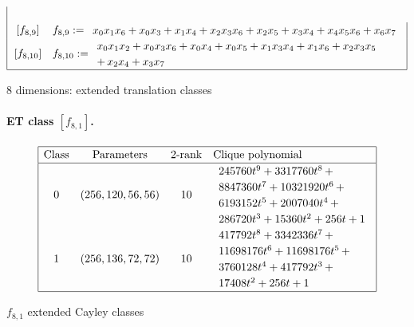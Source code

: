 \documentclass[12pt,a4paper]{article}
\begin{document}
\begin{table}[!bhpt]
\begin{align*}
\begin{array}{|cl|}
\\
\,[f_{ 8 , 9 }] & f_{ 8 , 9 } :=
\begin{array}{l}
x_{0} x_{1} x_{6} + x_{0} x_{3} + x_{1} x_{4} + x_{2} x_{3} x_{6} + x_{2} x_{5} + x_{3} x_{4} +
x_{4} x_{5} x_{6} + x_{6} x_{7}
\end{array}
\\
\,[f_{ 8 , 10 }] & f_{ 8 , 10 } :=
\begin{array}{l}
x_{0} x_{1} x_{2} + x_{0} x_{3} x_{6} + x_{0} x_{4} + x_{0} x_{5} + x_{1} x_{3} x_{4} + x_{1} x_{6}
+ x_{2} x_{3} x_{5}
\\
+\, x_{2} x_{4} + x_{3} x_{7}
\end{array}
\\
\hline
\end{array}
\end{align*}
\normalsize{}
\caption{8 dimensions: extended translation classes}
\label{tab-c8_ET_classes}
\end{table}
\paragraph*{ET class $[f_{8,1}]$.}
%
\begin{table}[!bhpt] %
\small{}
\begin{align*}
\def\arraystretch{1.2}
\begin{array}{|cccl|}
\hline
\text{Class} &
\text{Parameters} &
\text{2-rank} &
\text{Clique polynomial}
\\
\hline
0 &
(256, 120, 56, 56) &
10 &
\begin{array}{l}
245760t^{9} + 3317760t^{8}
\,+
\\
 8847360t^{7} + 10321920t^{6}
\,+
\\
 6193152t^{5} + 2007040t^{4}
\,+
\\
 286720t^{3} + 15360t^{2} + 256t + 1
\end{array}
\\
1 &
(256, 136, 72, 72) &
10 &
\begin{array}{l}
417792t^{8} + 3342336t^{7}
\,+
\\
 11698176t^{6} + 11698176t^{5}
\,+
\\
 3760128t^{4} + 417792t^{3}
\,+
\\
 17408t^{2} + 256t + 1
\end{array}
\\
\hline
\end{array}
\end{align*}
\caption{$f_{8,1}$ extended Cayley classes}
\label{tab-c8_1_EC_classes}
\end{table}
\end{document}
